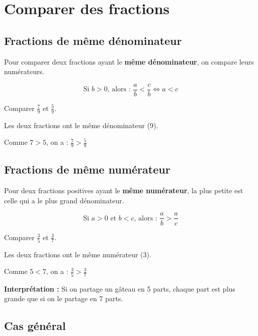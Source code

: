 \section{Comparer des fractions}

\subsection{Fractions de même dénominateur}

\begin{proprietebox}
	Pour comparer deux fractions ayant le \textbf{même dénominateur}, on compare leurs numérateurs.
	
	$$\text{Si } b > 0 \text{, alors : } \frac{a}{b} < \frac{c}{b} \Leftrightarrow a < c$$
\end{proprietebox}

\begin{examplebox}
	Comparer $\frac{7}{9}$ et $\frac{5}{9}$.
	
	Les deux fractions ont le même dénominateur (9).
	
	Comme $7 > 5$, on a : $\frac{7}{9} > \frac{5}{9}$
\end{examplebox}

\subsection{Fractions de même numérateur}

\begin{proprietebox}
	Pour deux fractions positives ayant le \textbf{même numérateur}, la plus petite est celle qui a le plus grand dénominateur.
	
	$$\text{Si } a > 0 \text{ et } b < c \text{, alors : } \frac{a}{b} > \frac{a}{c}$$
\end{proprietebox}

\begin{examplebox}
	Comparer $\frac{3}{5}$ et $\frac{3}{7}$.
	
	Les deux fractions ont le même numérateur (3).
	
	Comme $5 < 7$, on a : $\frac{3}{5} > \frac{3}{7}$
	
	\textbf{Interprétation :} Si on partage un gâteau en 5 parts, chaque part est plus grande que si on le partage en 7 parts.
\end{examplebox}

\subsection{Cas général}

